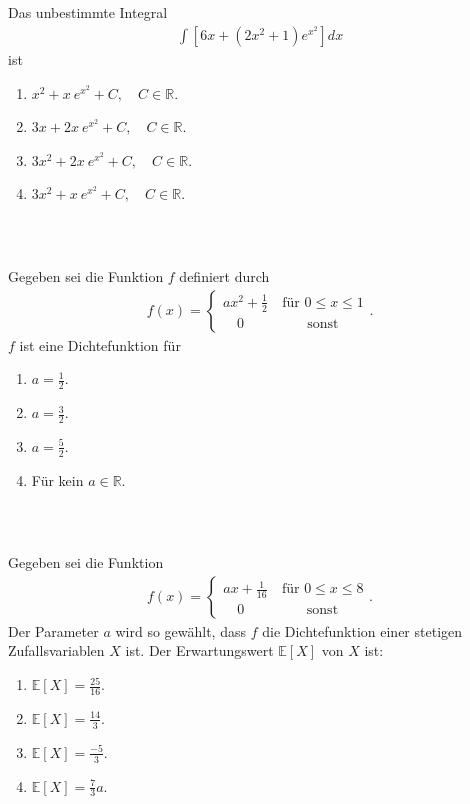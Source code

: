 \subsection*{}
Das unbestimmte Integral
\begin{align*}
\int \left[ 6x+ (2 x^2 + 1) e^{x^2} \right] dx
\end{align*}
ist
\renewcommand{\labelenumi}{(\alph{enumi})}
\begin{enumerate}
\item 
$ x^2 + x \ e^{x^2} + C, \quad C \in \mathbb{R} $.
\item 
$ 3x  + 2x  \ e^{x^2} + C, \quad C \in \mathbb{R} $.
\item
$ 3x^2  + 2x  \ e^{x^2} + C, \quad C \in \mathbb{R} $.
\item
$ 3x^2  + x  \ e^{x^2} + C, \quad C \in \mathbb{R} $.
\end{enumerate}
\ \\
\subsection*{}
Gegeben sei die Funktion $ f $ definiert durch
\begin{align*}
f(x) = 
\begin{cases}
a x^2 + \frac{1}{2} &\ \textrm{für } 0 \leq x \leq 1\\
\quad 0 &\qquad \textrm{sonst}
\end{cases}.
\end{align*}
$ f $ ist eine Dichtefunktion für
\renewcommand{\labelenumi}{(\alph{enumi})}
\begin{enumerate}
\item 
$ a = \frac{1}{2} $.
\item
$ a = \frac{3}{2} $.
\item
$ a = \frac{5}{2} $.
\item
Für kein $ a \in \mathbb{R} $.
\end{enumerate}
\ \\
\subsection*{}
Gegeben sei die Funktion
\begin{align*}
f(x) = 
\begin{cases}
a x + \frac{1}{16} &\ \textrm{für } 0 \leq x \leq 8\\
\quad 0 &\qquad \textrm{sonst}
\end{cases}.
\end{align*}
Der Parameter $ a $ wird so gewählt, dass $ f $ die Dichtefunktion einer stetigen Zufallsvariablen $ X $ ist. Der Erwartungswert $ \mathbb{E}[X] $ von $ X $ ist:
\renewcommand{\labelenumi}{(\alph{enumi})}
\begin{enumerate}
	\item 
	$ \mathbb{E}[X] = \frac{25}{16} $.
	\item
	$ \mathbb{E}[X] = \frac{14}{3} $.
	
	\item
	$ \mathbb{E}[X] = \frac{-5}{3} $.
	\item
	$ \mathbb{E}[X] = \frac{7}{3} a $.
\end{enumerate}
\ \\
